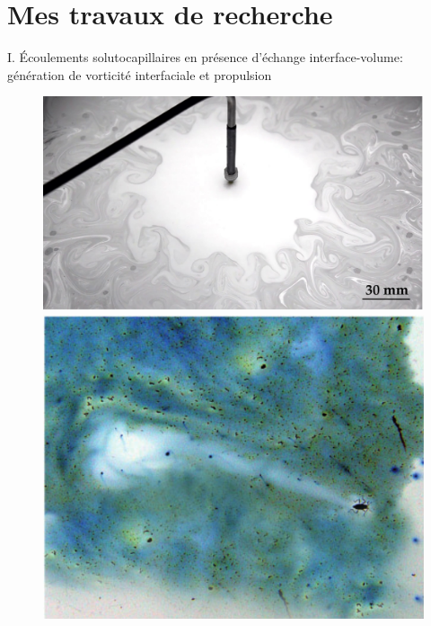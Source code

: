 \documentclass[aspectratio=169,10pt]{beamer}
\begin{document}
\section{Mes travaux de recherche}

\begin{frame}{I. Écoulements solutocapillaires en présence d'échange interface-volume: génération de vorticité interfaciale et propulsion}
    \begin{figure}[!ht]
        \begin{minipage}[c]{.45\textwidth}
        \includegraphics[width=1\textwidth]{./figures/Ecoulement_Marangoni.pdf}
        \end{minipage}\hfill
        \begin{minipage}[c]{.45\textwidth}
        \includegraphics[width=.72\textwidth]{./figures/microvelia.png}
        \end{minipage}
    \end{figure}
\end{frame}
\end{document}
